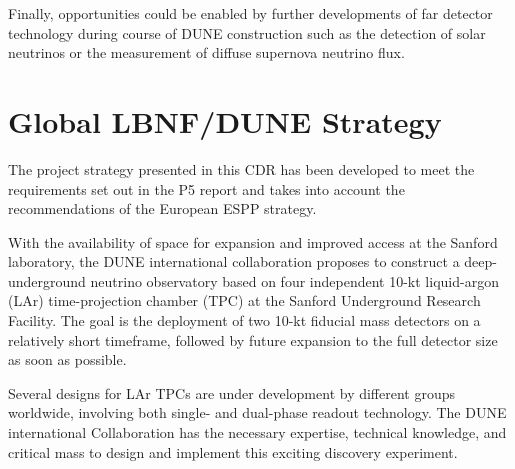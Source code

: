 Finally, opportunities could be enabled by further developments of far detector technology during course of DUNE construction such as the detection of
solar neutrinos or the measurement of diffuse supernova neutrino flux.


\section{Global LBNF/DUNE Strategy}

The project strategy presented in this CDR has been developed to meet the requirements 
set out in the P5 report and %
takes into account the recommendations of the European 
ESPP strategy.

With the availability of space for expansion and improved access at the Sanford laboratory, 
the DUNE international collaboration proposes to construct a deep-underground neutrino observatory based on four independent 10-kt liquid-argon (LAr) time-projection chamber (TPC) at the Sanford Underground Research Facility.  
The goal is the deployment of two 10-kt fiducial mass detectors on a relatively short timeframe, followed by future expansion to the full detector size as soon as possible. 

Several designs for LAr TPCs are under development by different groups worldwide, involving both single- and dual-phase readout technology.
The DUNE international Collaboration has the necessary expertise, technical knowledge, and critical mass to design and implement this exciting discovery experiment. 

